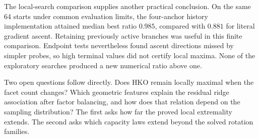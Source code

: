 The local-search comparison supplies another practical conclusion. On the
same 64 starts under common evaluation limits, the four-anchor history
implementation attained median best ratio $0.985$, compared with $0.881$
for literal gradient ascent. Retaining previously active branches was useful
in this finite comparison. Endpoint tests nevertheless found ascent
directions missed by simpler probes, so high terminal values did not certify
local maxima. None of the exploratory searches produced a new numerical
ratio above one.

Two open questions follow directly. Does HKO remain locally maximal
when the facet count changes? Which geometric features explain the residual
ridge association after factor balancing, and how does that relation depend
on the sampling distribution? The
first asks how far the proved local extremality extends. The second asks
which capacity laws extend beyond the solved rotation families.
